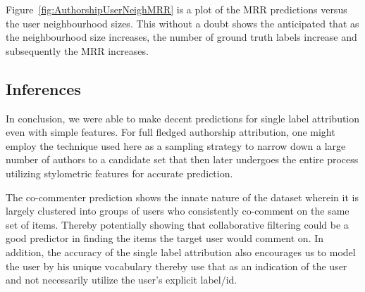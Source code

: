 Figure~\ref{fig:AuthorshipUserNeighMRR} is a plot of the MRR predictions versus the user neighbourhood sizes. This without a doubt shows the anticipated that as the neighbourhood size increases, the number of ground truth labels increase and subsequently the MRR increases.

\subsection{Inferences}
In conclusion, we were able to make decent predictions for single label attribution even with simple features. For full fledged authorship attribution, one might employ the technique used here as a sampling strategy to narrow down a large number of authors to a candidate set that then later undergoes the entire process utilizing stylometric features for accurate prediction.

The co-commenter prediction shows the innate nature of the dataset wherein it is largely clustered into groups of users who consistently co-comment on the same set of items. Thereby potentially showing that collaborative filtering could be a good predictor in finding the items the target user would comment on. In addition, the accuracy of the single label attribution also encourages us to model the user by his unique vocabulary thereby use that as an indication of the user and not necessarily utilize the user's explicit label/id.